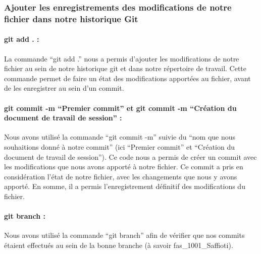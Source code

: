 \documentclass[
  letterpaper,
  DIV=11,
  numbers=noendperiod]{scrartcl}
\let\oldparagraph\paragraph
\renewcommand{\paragraph}[1]{\oldparagraph{#1}\mbox{}}
\begin{document}
\hypertarget{ajouter-les-enregistrements-des-modifications-de-notre-fichier-dans-notre-historique-git}{%
\subsubsection{Ajouter les enregistrements des modifications de notre
fichier dans notre historique
Git}\label{ajouter-les-enregistrements-des-modifications-de-notre-fichier-dans-notre-historique-git}}

\hypertarget{git-add-.}{%
\paragraph{git add . :}\label{git-add-.}}

La commande ``git add .'' nous a permis d'ajouter les modifications de
notre fichier au sein de notre historique git et dans notre répertoire
de travail. Cette commande permet de faire un état des modifications
apportées au fichier, avant de les enregistrer au sein d'un commit.

\hypertarget{git-commit--m-premier-commit-et-git-commit--m-cruxe9ation-du-document-de-travail-de-session}{%
\paragraph{git commit -m ``Premier commit'' et git commit -m ``Création
du document de travail de session''
:}\label{git-commit--m-premier-commit-et-git-commit--m-cruxe9ation-du-document-de-travail-de-session}}

Nous avons utilisé la commande ``git commit -m'' suivie du ``nom que
nous souhaitions donné à notre commit'' (ici ``Premier commit'' et
``Création du document de travail de session''). Ce code nous a permis
de créer un commit avec les modifications que nous avons apporté à notre
fichier. Ce commit a pris en considération l'état de notre fichier, avec
les changements que nous y avons apporté. En somme, il a permis
l'enregistrement définitif des modifications du fichier.

\hypertarget{git-branch}{%
\paragraph{git branch :}\label{git-branch}}

Nous avons utilisé la commande ``git branch'' afin de vérifier que nos
commits étaient effectués au sein de la bonne branche (à savoir
fas\_1001\_Saffioti).
\end{document}
